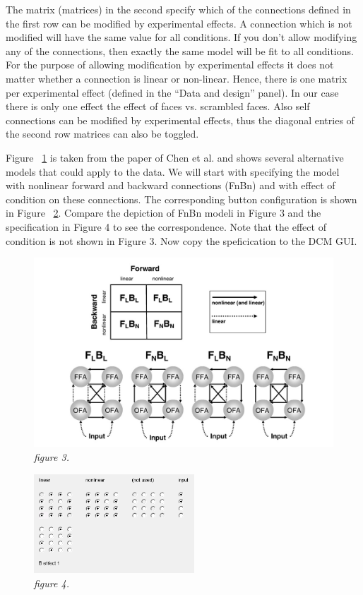 The matrix (matrices) in the second specify which of the connections defined in the first row can be modified by experimental effects. A connection which is not modified will have the same value for all conditions. If you don't allow modifying any of the connections, then exactly the same model will be fit to all conditions. For the purpose of allowing modification by experimental effects it does not matter whether a connection is linear or non-linear. Hence, there is one matrix per experimental effect (defined in the ``Data and design'' panel). In our case there is only one effect the effect of faces vs. scrambled faces. Also self connections can be modified by experimental effects, thus the diagonal entries of the second row matrices can also be toggled.

Figure ~\ref{dcm-ir:fig:3} is taken from the paper of Chen et al. \cite{cc_asymm} and shows several alternative models that could apply to the data. We will start with specifying the model with nonlinear forward and backward connections (FnBn) and with effect of condition on these connections. The corresponding button configuration is shown in Figure ~\ref{dcm-ir:fig:4}. Compare the depiction of FnBn modeli in Figure 3 and the specification in Figure 4 to see the correspondence. Note that the effect of condition is not shown in Figure 3. Now copy the speficication to the DCM GUI.

\begin{figure}
\begin{center}
\includegraphics[width=160mm]{dcm_ir/figures/figure3}
\caption{\em  figure 3. \label{dcm-ir:fig:3}}
\end{center}
\end{figure}

\begin{figure}
\begin{center}
\includegraphics[width=60mm]{dcm_ir/figures/figure4}
\caption{\em  figure 4. \label{dcm-ir:fig:4}}
\end{center}
\end{figure}

